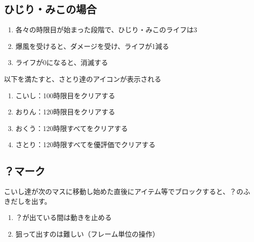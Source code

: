 \clearpage
\subsection{ひじり・みこの場合}
\begin{enumerate}[label={\sarrow}]
\item 各々の時限目が始まった段階で、ひじり・みこのライフは3
\item 爆風を受けると、ダメージを受け、ライフが1減る
\item ライフが0になると、消滅する
\end{enumerate}



以下を満たすと、さとり達のアイコンが表示される
\begin{enumerate}[label={\sarrow}]
\item こいし：100時限目をクリアする
\item おりん：120時限目をクリアする
\item おくう：120時限すべてをクリアする
\item さとり：120時限すべてを優評価でクリアする
\end{enumerate}





\subsection{？\hspace{0pt}マーク}
こいし達が次のマスに移動し始めた直後にアイテム等でブロックすると、？\hspace{0pt}のふきだしを出す。
\begin{enumerate}[label={\sarrow}]
\item ？\hspace{0pt}が出ている間は動きを止める
\item 狙って出すのは難しい（フレーム単位の操作）
\end{enumerate}



